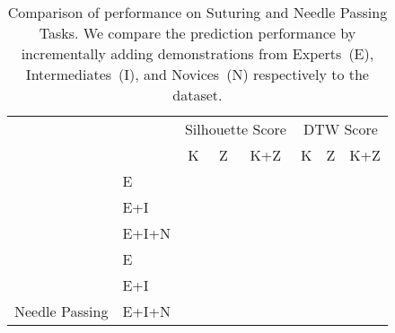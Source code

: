\begin{table}[ht]
\centering
\caption{Comparison of \TSC performance on Suturing and Needle Passing Tasks. We compare the prediction performance by incrementally adding demonstrations from Experts~(E), Intermediates~(I), and Novices~(N) respectively to the dataset.}
\label{tab:jigsaws}
\begin{tabular}{ll|l|l|l|l|l|l}
\multicolumn{2}{c}{}                                     &     \multicolumn{3}{c}{\cellcolor[HTML]{CBCEFB}Silhouette Score} & \multicolumn{3}{c}{\cellcolor[HTML]{FFC72C}DTW Score}\\
\multicolumn{2}{c}{}    & \multicolumn{1}{c|}{K} & \multicolumn{1}{c|}{Z} & \multicolumn{1}{c|}{K+Z}& \multicolumn{1}{c|}{K} & \multicolumn{1}{c|}{Z} & \multicolumn{1}{c}{K+Z} \\ \hline \hline 
\rowcolor[HTML]{E0E0E0}
\cellcolor[HTML]{CBCEFB}                                 & E     & &    &   &   &  &    \\ 
\cellcolor[HTML]{CBCEFB}                                 & E+I   & &    &   &   &  &    \\ 
\rowcolor[HTML]{E0E0E0}
\multirow{-3}{*}{\cellcolor[HTML]{CBCEFB}Suturing}       & E+I+N & &    &   &   &  &    \\ 
\cellcolor[HTML]{FFC72C}                                 & E     & &    &   &   &  &    \\ 
\rowcolor[HTML]{E0E0E0}
\cellcolor[HTML]{FFC72C}                                 & E+I   & &    &   &   &  &    \\ 
\multirow{-3}{*}{\cellcolor[HTML]{FFC72C}\parbox{1.2cm}{Needle Passing}} & E+I+N & &    &   &   &  &    \\ \hline
\end{tabular}
\end{table}






